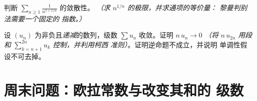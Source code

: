 \begin{exercise}[$\star\star$]\label{exo:b1:series:11}
判断 $\displaystyle\sum_{n \geq 1} \frac{1}{n^{1 + 1/n}}$ 的敛散性。
\emph{（求 $n^{1/n}$ 的极限，并求通项的等价量：
黎曼判别法需要一个\emph{固定}的
指数。）}
\end{exercise}

\begin{exercise}[$\star\star\star$]\label{exo:b1:series:12}
设 $(u_n)$ 为非负且\emph{递减}的数列，级数 $\sum u_n$
收敛。证明 $n\,u_n \to 0$ \emph{（将 $n\,u_{2n}$
用段和 $\sum_{k=n+1}^{2n} u_k$ 控制，并利用柯西
准则）}。证明逆命题不成立，并说明
单调性假设不可去掉。
\end{exercise}

\section{周末问题：欧拉常数与改变其和的
级数}

